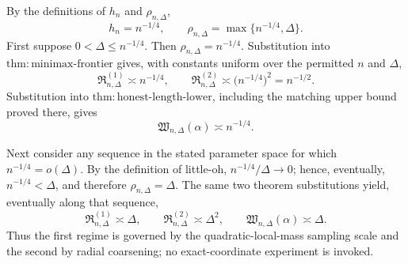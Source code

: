 By the definitions of \(h_n\) and \(\rho_{n,\Delta}\),
\[
 h_n=n^{-1/4},
 \qquad
 \rho_{n,\Delta}=\max\{n^{-1/4},\Delta\}.
\]
First suppose \(0<\Delta\leq n^{-1/4}\).  Then \(\rho_{n,\Delta}=n^{-1/4}\).  Substitution into \(\mathrm{thm:minimax\text{-}frontier}\) gives, with constants uniform over the permitted \(n\) and \(\Delta\),
\[
 \mathfrak R^{(1)}_{n,\Delta}\asymp n^{-1/4},
 \qquad
 \mathfrak R^{(2)}_{n,\Delta}\asymp
 \bigl(n^{-1/4}\bigr)^2=n^{-1/2}.
\]
Substitution into \(\mathrm{thm:honest\text{-}length\text{-}lower}\), including the matching upper bound proved there, gives
\[
 \mathfrak W_{n,\Delta}(\alpha)\asymp n^{-1/4}.
\]

Next consider any sequence in the stated parameter space for which \(n^{-1/4}=o(\Delta)\).  By the definition of little-oh, \(n^{-1/4}/\Delta\to0\); hence, eventually, \(n^{-1/4}<\Delta\), and therefore \(\rho_{n,\Delta}=\Delta\).  The same two theorem substitutions yield, eventually along that sequence,
\[
 \mathfrak R^{(1)}_{n,\Delta}\asymp\Delta,
 \qquad
 \mathfrak R^{(2)}_{n,\Delta}\asymp\Delta^2,
 \qquad
 \mathfrak W_{n,\Delta}(\alpha)\asymp\Delta.
\]
Thus the first regime is governed by the quadratic-local-mass sampling scale and the second by radial coarsening; no exact-coordinate experiment is invoked.